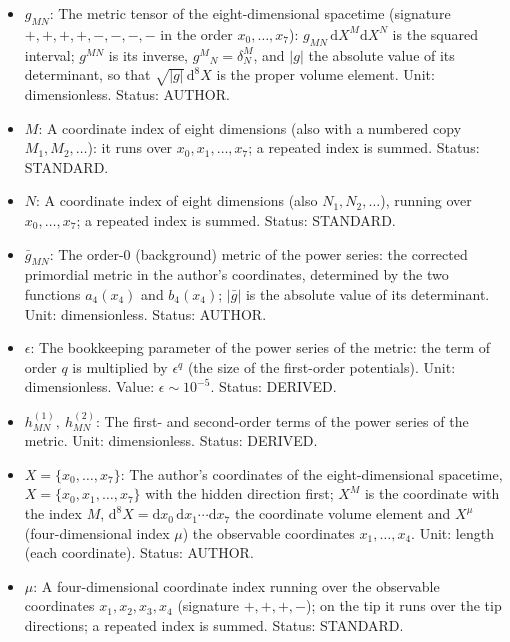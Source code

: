 \documentclass[
  10pt,
]{article}
\providecommand{\tightlist}{%
  \setlength{\itemsep}{0pt}\setlength{\parskip}{0pt}}
\begin{document}
\begin{itemize}
\tightlist
\item
  \(g_{MN}\): The metric tensor of the eight-dimensional spacetime
  (signature \(+,+,+,+,-,-,-,-\) in the order \(x_0, \dots, x_7\)):
  \(g_{MN}\,\mathrm{d}X^M\mathrm{d}X^N\) is the squared interval;
  \(g^{MN}\) is its inverse, \(g^M{}_N = \delta^M_N\), and
  \(\lvert g\rvert\) the absolute value of its determinant, so that
  \(\sqrt{\lvert g\rvert}\,\mathrm{d}^8X\) is the proper volume element.
  Unit: dimensionless. Status: AUTHOR.
\item
  \(M\): A coordinate index of eight dimensions (also with a numbered
  copy \(M_1, M_2, \dots\)): it runs over \(x_0, x_1, \dots, x_7\); a
  repeated index is summed. Status: STANDARD.
\item
  \(N\): A coordinate index of eight dimensions (also
  \(N_1, N_2, \dots\)), running over \(x_0, \dots, x_7\); a repeated
  index is summed. Status: STANDARD.
\item
  \(\bar g_{MN}\): The order-0 (background) metric of the power series:
  the corrected primordial metric in the author's coordinates,
  determined by the two functions \(a_4(x_4)\) and \(b_4(x_4)\);
  \(\lvert\bar g\rvert\) is the absolute value of its determinant. Unit:
  dimensionless. Status: AUTHOR.
\item
  \(\epsilon\): The bookkeeping parameter of the power series of the
  metric: the term of order \(q\) is multiplied by \(\epsilon^q\) (the
  size of the first-order potentials). Unit: dimensionless. Value:
  \(\epsilon \sim 10^{-5}\). Status: DERIVED.
\item
  \(h^{(1)}_{MN},\ h^{(2)}_{MN}\): The first- and second-order terms of
  the power series of the metric. Unit: dimensionless. Status: DERIVED.
\item
  \(X = \{x_0, \dots, x_7\}\): The author's coordinates of the
  eight-dimensional spacetime, \(X = \{x_0, x_1, \dots, x_7\}\) with the
  hidden direction first; \(X^M\) is the coordinate with the index
  \(M\),
  \(\mathrm{d}^8X = \mathrm{d}x_0\,\mathrm{d}x_1\cdots\mathrm{d}x_7\)
  the coordinate volume element and \(X^\mu\) (four-dimensional index
  \(\mu\)) the observable coordinates \(x_1, \dots, x_4\). Unit: length
  (each coordinate). Status: AUTHOR.
\item
  \(\mu\): A four-dimensional coordinate index running over the
  observable coordinates \(x_1, x_2, x_3, x_4\) (signature \(+,+,+,-\));
  on the tip it runs over the tip directions; a repeated index is
  summed. Status: STANDARD.

\end{itemize}
\end{document}
